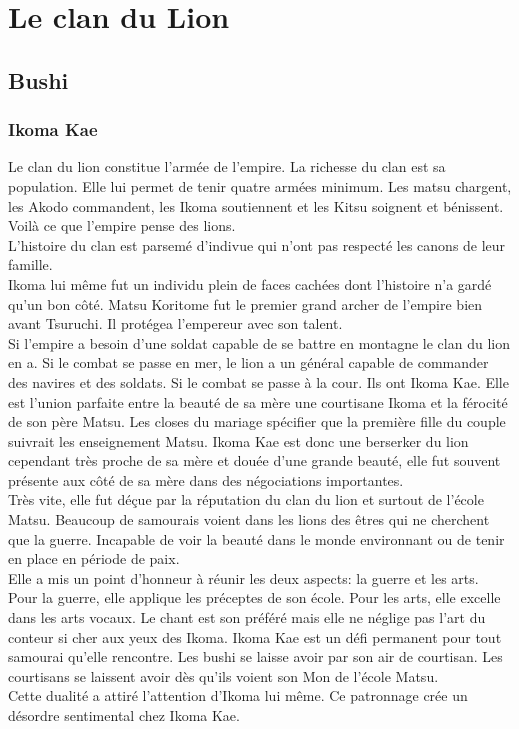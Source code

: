 \documentclass[10pt,a4paper]{book}
\begin{document}
\chapter{Le clan du Lion}

\section{Bushi}
\subsection{Ikoma Kae}

Le clan du lion constitue l’armée de l’empire. La richesse du clan est sa population.
Elle lui permet de tenir quatre armées minimum. Les matsu chargent, les Akodo commandent, les Ikoma soutiennent et les Kitsu soignent et bénissent.
Voilà ce que l’empire pense des lions. \\
L’histoire du clan est parsemé d’indivue qui n’ont pas respecté les canons de leur famille. \\
Ikoma lui même fut un individu plein de faces cachées dont l’histoire n’a gardé qu’un bon côté.
Matsu Koritome fut le premier grand archer de l’empire bien avant Tsuruchi. Il protégea l’empereur avec son talent.\\
Si l’empire a besoin d’une soldat capable de se battre en montagne le clan du lion en a.
Si le combat se passe en mer, le lion a un général capable de commander des navires et des soldats.
Si le combat se passe à la cour. Ils ont Ikoma Kae. Elle est l’union parfaite entre la beauté de sa mère une courtisane Ikoma et la férocité de son père Matsu.
Les closes du mariage spécifier que la première fille du couple suivrait les enseignement Matsu.
Ikoma Kae est donc une berserker du lion cependant très proche de sa mère et douée d’une grande beauté, elle fut souvent présente aux côté de sa mère dans des négociations importantes.\\
Très vite, elle fut déçue par la réputation du clan du lion et surtout de l’école Matsu.
Beaucoup de samourais voient dans les lions des êtres qui ne cherchent que la guerre.
Incapable de voir la beauté dans le monde environnant ou de tenir en place en période de paix.\\
Elle a mis un point d’honneur à réunir les deux aspects: la guerre et les arts.\\
Pour la guerre, elle applique les préceptes de son école. Pour les arts, elle excelle dans les arts vocaux. Le chant est son préféré mais elle ne néglige pas l’art du conteur si cher aux yeux des Ikoma.
Ikoma Kae est un défi permanent pour tout samourai qu’elle rencontre. Les bushi se laisse
avoir par son air de courtisan. Les courtisans se laissent avoir dès qu’ils voient son Mon
de l’école Matsu.\\
Cette dualité a attiré l’attention d’Ikoma lui même. Ce patronnage crée un désordre sentimental chez Ikoma Kae.
\end{document}
